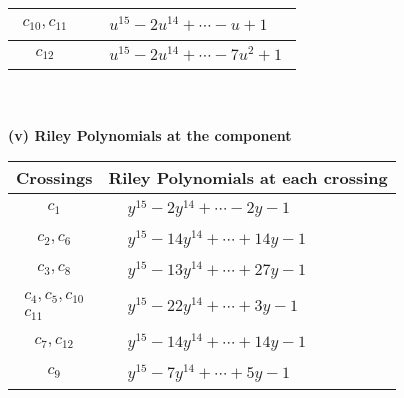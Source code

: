 \documentclass[1p]{elsarticle_modified}
\theoremstyle{definition}
\begin{document}
\begin{tabular}{m{50pt}|m{274pt}}
\hline $$\begin{aligned}c_{10},c_{11}\end{aligned}$$&$\begin{aligned}
&u^{15}-2 u^{14}+\cdots- u+1
\end{aligned}$\\
\hline $$\begin{aligned}c_{12}\end{aligned}$$&$\begin{aligned}
&u^{15}-2 u^{14}+\cdots-7 u^2+1
\end{aligned}$\\
\hline
\end{tabular}\\~\\
\newpage\renewcommand{\arraystretch}{1}
\flushleft \textbf{(v) Riley Polynomials at the component}\newline \\
\begin{tabular}{m{50pt}|m{274pt}}
Crossings & \hspace{64pt}Riley Polynomials at each crossing \\
\hline $$\begin{aligned}c_{1}\end{aligned}$$&$\begin{aligned}
&y^{15}-2 y^{14}+\cdots-2 y-1
\end{aligned}$\\
\hline $$\begin{aligned}c_{2},c_{6}\end{aligned}$$&$\begin{aligned}
&y^{15}-14 y^{14}+\cdots+14 y-1
\end{aligned}$\\
\hline $$\begin{aligned}c_{3},c_{8}\end{aligned}$$&$\begin{aligned}
&y^{15}-13 y^{14}+\cdots+27 y-1
\end{aligned}$\\
\hline $$\begin{aligned}c_{4},c_{5},c_{10}\\c_{11}\end{aligned}$$&$\begin{aligned}
&y^{15}-22 y^{14}+\cdots+3 y-1
\end{aligned}$\\
\hline $$\begin{aligned}c_{7},c_{12}\end{aligned}$$&$\begin{aligned}
&y^{15}-14 y^{14}+\cdots+14 y-1
\end{aligned}$\\
\hline $$\begin{aligned}c_{9}\end{aligned}$$&$\begin{aligned}
&y^{15}-7 y^{14}+\cdots+5 y-1
\end{aligned}$\\
\hline
\end{tabular}\\~\\
\end{document}
